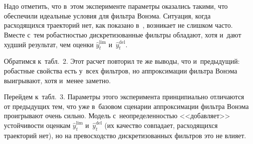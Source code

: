 \begin{multicols}{2}
\begin{figure*}[b] %
\vspace*{6pt}
\begin{center}
   \mbox{%
\epsfxsize=163mm
}
\end{center}
\vspace*{-11pt}
     \vspace*{6pt}
\begin{center}
   \mbox{%
\epsfxsize=163mm
}
\end{center}
\vspace*{-11pt}
\vspace*{-3pt}
      \end{figure*}

      
      Надо отметить, что в~этом эксперименте па\-ра\-мет\-ры оказались такими, 
что обеспечили идеальные условия для фильт\-ра Вонэма. Ситуация, когда 
расходящихся траекторий нет, как показано в~\cite{19-bos}, возникает не 
слишком час\-то. Вмес\-те с~тем ро\-баст\-ностью дискретизованные фильт\-ры 
обладают, хотя и~дают худший результат, чем оценки $\hat{y}_t^{\mathrm{lim}}$ 
и~$\hat{y}_t^{\mathrm{del}}$.


      

      Обратимся к~табл.~2. Этот расчет повторил те же выводы, что 
и~предыду\-щий: робастные свойства есть у~всех фильт\-ров, но аппроксимации 
фильт\-ра Вонэма выигрывают, хотя и~менее заметно.


      
      
      Перейдем к~табл.~3. Па\-ра\-мет\-ры этого эксперимента принципиально 
отличаются от предыду\-щих тем, что уже в~базовом сценарии аппроксимации 
фильт\-ра Вонэма проигрывают очень сильно. Модель с~неопределенностью 
<<добавляет>> устой\-чи\-вости оценкам $\hat{y}_t^{\mathrm{lim}}$ и~$\hat{y}_t^{\mathrm{del}}$ 
(их качество совпадает, расходящихся траекторий нет), но на превосходство 
дискретизованных фильт\-ров это не влияет.



\end{multicols}
